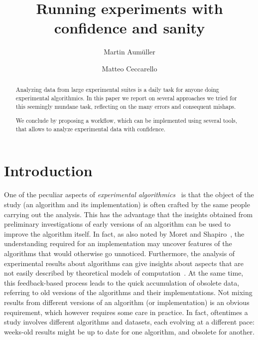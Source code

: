 \documentclass{llncs}
\begin{document}
\title{Running experiments with confidence and sanity}
%
%
\author{
  Martin Aumüller \and
  Matteo Ceccarello}
%
%
%
\maketitle              %
%
\begin{abstract}
Analyzing data from large experimental suites is a daily task for
anyone doing experimental algorithmics.
In this paper we report on several approaches we tried for this 
seemingly mundane task, reflecting on the many errors and consequent
mishaps.

We conclude by proposing a workflow, which can be implemented using several
tools, that allows to analyze experimental data with confidence.

\end{abstract}

\section{Introduction}

One of the peculiar aspects of \emph{experimental algorithmics}~\cite{DBLP:conf/dimacs/Moret99}
is that the object of the study (an algorithm and its implementation)
is often crafted by the same people carrying out the analysis.
This has the advantage that the insights obtained from preliminary
investigations of early versions of an algorithm can be used to improve the
algorithm itself.
In fact, as also noted by Moret and Shapiro~\cite{DBLP:journals/jucs/MoretS01},
the understanding required for an implementation may uncover features of the
algorithms that would otherwise go unnoticed.
Furthermore, the analysis of experimental results about algorithms can give
insights about aspects that are not easily described by theoretical
models of computation~\cite{DBLP:journals/cacm/McGeoch07}.
At the same time, this feedback-based process leads to the quick
accumulation of obsolete data, referring to old versions of the
algorithms and their implementations.
Not mixing results from different versions of
an algorithm (or implementation) is an obvious requirement, which
however requires some care in practice.
In fact, oftentimes a study involves different algorithms and datasets,
each evolving at a different pace: weeks-old results might be up to date
for one algorithm, and obsolete for another.
\end{document}
